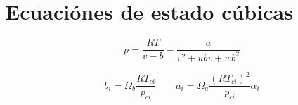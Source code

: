 \section{Ecuaciónes de estado cúbicas}

\begin{equation}
	p = \frac{R T}{v-b} - \frac{a}{v^2 +u b v + w b^2 }
\end{equation}

\begin{equation}
	b_i = \Omega_b \frac{R T_{ci}}{p_{ci}} \qquad a_i = \Omega_a \frac{\left(R T_{ci}\right)^2}{p_{ci}} \alpha_i
\end{equation}